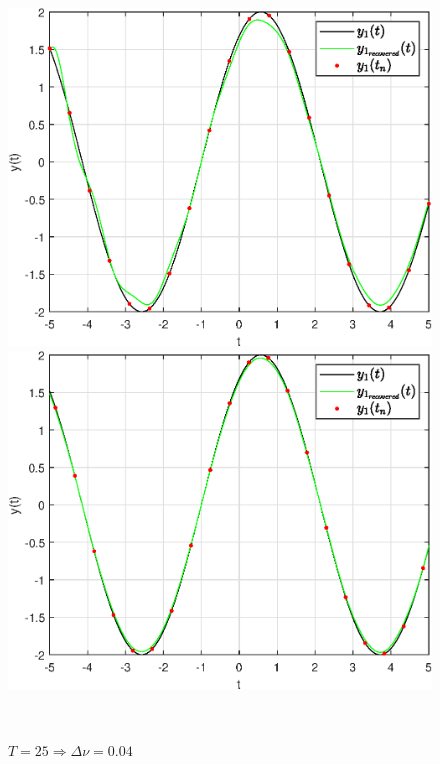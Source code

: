 \documentclass[a4paper]{article}
\begin{document}
\begin{figure}[H]
    \begin{minipage}{0.5\textwidth}
        \centering \includegraphics[width=\textwidth]{graphs2/T_10_dt_0.5_B_1_dv_0.1/func1_recovered.eps}
        \caption{$T = 10 \Rightarrow \Delta \nu = 0.1$}
    \end{minipage}\hfill
    \begin{minipage}{0.5\textwidth}
        \centering \includegraphics[width=\textwidth]{graphs2/T_25_dt_0.5_B_1_dv_0.04/func1_recovered.eps}
        \caption{$T = 25 \Rightarrow \Delta \nu = 0.04$}
    \end{minipage}\\[1em]
\end{figure}\noindent\
\end{document}
